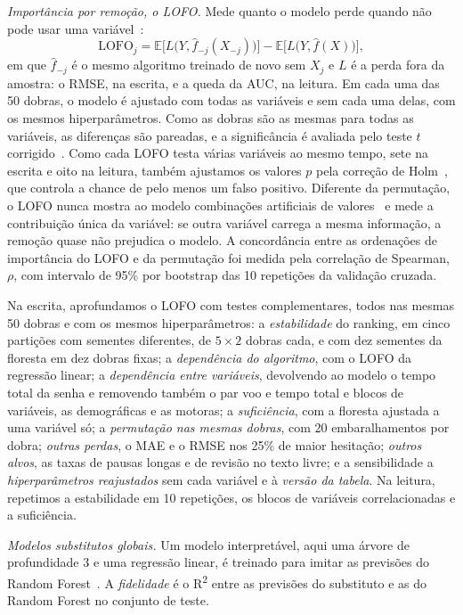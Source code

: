 \documentclass[conference]{IEEEtran}
\newcommand{\RF}{Random Forest}
\newcommand{\Rdois}{R\textsuperscript{2}}
\begin{document}
\emph{Importância por remoção, o LOFO.} Mede quanto o modelo perde quando não
pode usar uma variável~\cite{lei2018loco,williamson2023general}:
\begin{equation}
\mathrm{LOFO}_j = \mathbb{E}\big[L\big(Y, \hat f_{-j}(X_{-j})\big)\big] - \mathbb{E}\big[L\big(Y, \hat f(X)\big)\big],
\end{equation}
em que $\hat f_{-j}$ é o mesmo algoritmo treinado de novo sem $X_j$ e $L$ é a
perda fora da amostra: o RMSE, na escrita, e a queda da AUC, na leitura. Em
cada uma das 50 dobras, o modelo é ajustado com todas as variáveis e sem cada
uma delas, com os mesmos hiperparâmetros. Como as dobras são as mesmas para
todas as variáveis, as diferenças são pareadas, e a significância é avaliada
pelo teste $t$ corrigido~\cite{nadeau2003inference}. Como cada LOFO testa
várias variáveis ao mesmo tempo, sete na escrita e oito na leitura, também
ajustamos os valores $p$ pela correção de Holm~\cite{holm1979simple}, que
controla a chance de pelo menos um falso positivo. Diferente da permutação, o LOFO nunca mostra ao modelo
combinações artificiais de valores~\cite{hooker2021permutation} e mede a
contribuição única da variável: se outra variável carrega a mesma informação, a
remoção quase não prejudica o modelo. A concordância entre as ordenações de
importância do LOFO e da permutação foi medida pela correlação de Spearman,
$\rho$, com intervalo de 95\% por bootstrap das 10 repetições da validação
cruzada.

Na escrita, aprofundamos o LOFO com testes complementares, todos nas mesmas 50
dobras e com os mesmos hiperparâmetros: a \emph{estabilidade} do ranking, em
cinco partições com sementes diferentes, de $5 \times 2$ dobras cada, e com
dez sementes da floresta em dez dobras fixas; a \emph{dependência do
algoritmo}, com o LOFO da regressão linear; a \emph{dependência entre
variáveis}, devolvendo ao modelo o tempo total da senha e removendo também o
par voo e tempo total e blocos de variáveis, as demográficas e as motoras; a
\emph{suficiência}, com a floresta ajustada a uma variável só; a
\emph{permutação nas mesmas dobras}, com 20 embaralhamentos por dobra;
\emph{outras perdas}, o MAE e o RMSE nos 25\% de maior hesitação; \emph{outros
alvos}, as taxas de pausas longas e de revisão no texto livre; e a
sensibilidade a \emph{hiperparâmetros reajustados} sem cada variável e à
\emph{versão da tabela}. Na leitura, repetimos a estabilidade em 10 repetições,
os blocos de variáveis correlacionadas e a suficiência.

\emph{Modelos substitutos globais.} Um modelo interpretável, aqui uma árvore de
profundidade 3 e uma regressão linear, é treinado para imitar as previsões do
\RF{}~\cite{craven1996trepan,molnar2022}. A \emph{fidelidade} é o \Rdois{}
entre as previsões do substituto e as do \RF{} no conjunto de teste.
\end{document}
